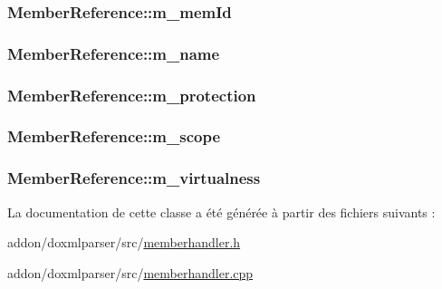 \subsubsection[{m\+\_\+mem\+Id}]{ Member\+Reference\+::m\+\_\+mem\+Id}\label{class_member_reference_a9c0cae213f1647442e29a9ad1f56833d}
\hypertarget{class_member_reference_adc9c0013ea80b42b6283986c60e8b3bc}{}
\subsubsection[{m\+\_\+name}]{ Member\+Reference\+::m\+\_\+name}\label{class_member_reference_adc9c0013ea80b42b6283986c60e8b3bc}
\hypertarget{class_member_reference_a6edbce27f90770bfae829ee386f762d6}{}
\subsubsection[{m\+\_\+protection}]{ Member\+Reference\+::m\+\_\+protection}\label{class_member_reference_a6edbce27f90770bfae829ee386f762d6}
\hypertarget{class_member_reference_ab3ee8bae0bc0127e774321768c5416f4}{}
\subsubsection[{m\+\_\+scope}]{ Member\+Reference\+::m\+\_\+scope}\label{class_member_reference_ab3ee8bae0bc0127e774321768c5416f4}
\hypertarget{class_member_reference_ab6a5f4ea5553c90f401e9994be7350b0}{}
\subsubsection[{m\+\_\+virtualness}]{ Member\+Reference\+::m\+\_\+virtualness}\label{class_member_reference_ab6a5f4ea5553c90f401e9994be7350b0}


La documentation de cette classe a été générée à partir des fichiers suivants \+:\begin{DoxyCompactItemize}
\item 
addon/doxmlparser/src/\hyperlink{memberhandler_8h}{memberhandler.\+h}\item 
addon/doxmlparser/src/\hyperlink{memberhandler_8cpp}{memberhandler.\+cpp}\end{DoxyCompactItemize}
